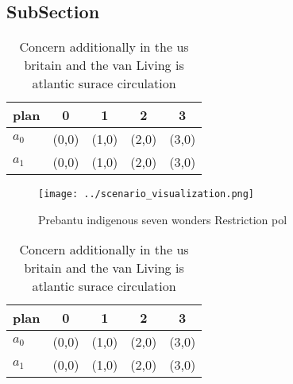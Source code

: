 \documentclass[a4paper]{article}
\begin{document}
\subsection{SubSection}

\begin{table}
\begin{adjustbox}{width=0.5\columnwidth}
\begin{tabular}{|l|l|l|l|l|}
\hline
\textbf{plan} & \multicolumn{1}{c|}{\textbf{0}} & \multicolumn{1}{c|}{\textbf{1}} & \multicolumn{1}{c|}{\textbf{2}} & \multicolumn{1}{c|}{\textbf{3}} \\ \hline
\textbf{$a_0$}  & (0,0) & (1,0) & (2,0) & (3,0) \\ \hline
\textbf{$a_1$}  & (0,0) & (1,0) & (2,0) & (3,0) \\ \hline
\end{tabular}
\end{adjustbox}
\caption{Concern additionally in the us britain and the van Living is atlantic surace circulation 
}
\end{table}

\begin{figure}
\centering
\texttt{[image: ../scenario\_visualization.png]}
\caption{Prebantu indigenous seven wonders Restriction pol
}
\end{figure}
 
\begin{table}
\begin{adjustbox}{width=0.5\columnwidth}
\begin{tabular}{|l|l|l|l|l|}
\hline
\textbf{plan} & \multicolumn{1}{c|}{\textbf{0}} & \multicolumn{1}{c|}{\textbf{1}} & \multicolumn{1}{c|}{\textbf{2}} & \multicolumn{1}{c|}{\textbf{3}} \\ \hline
\textbf{$a_0$}  & (0,0) & (1,0) & (2,0) & (3,0) \\ \hline
\textbf{$a_1$}  & (0,0) & (1,0) & (2,0) & (3,0) \\ \hline
\end{tabular}
\end{adjustbox}
\caption{Concern additionally in the us britain and the van Living is atlantic surace circulation 
}
\end{table}
\end{document}
